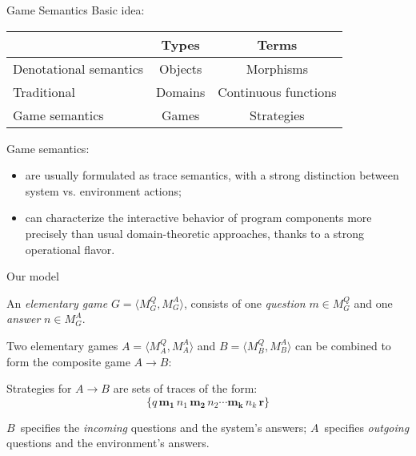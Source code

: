 \documentclass{beamer}
\begin{document}
\begin{frame}{Game Semantics} %
Basic idea:
\begin{center}
  \begin{tabular}{lcc}
  \hline
   & Types & Terms \\
  \hline
  Denotational semantics & Objects & Morphisms \\
  \hspace{1em} Traditional & Domains & Continuous functions \\
  \hspace{1em} Game semantics & Games & Strategies \\
  \hline
  \end{tabular}
\end{center}

\vfill
Game semantics:
\begin{itemize}
\item
  are usually formulated as trace semantics,
  with a strong distinction between
  system vs. environment actions;
\item
  can characterize
  the interactive behavior of program components
  more precisely than
  usual domain-theoretic approaches,
  thanks to a strong operational flavor.
\end{itemize}
\vfill
\end{frame}

\begin{frame}{Our model} %

An
\emph{elementary game}
$G = \langle M_G^Q, M_G^A \rangle$,
consists of
one \emph{question} $m \in M_G^Q$ and
one \emph{answer} $n \in M_G^A$.

\vspace{1ex}
Two elementary games
$A = \langle M_A^Q, M_A^A \rangle$ and
$B = \langle M_B^Q, M_B^A \rangle$
can be combined to form
the composite game $A \rightarrow B$:
\begin{center}
\end{center}

Strategies for $A \rightarrow B$ are sets of traces of the form:
\[
   \{ q \, \mathbf{m_1} \, n_1 \, \mathbf{m_2} \, n_2 \cdots \mathbf{m_k} \, n_k \, \mathbf{r} \}
\]

$B$~specifies the \emph{incoming} questions
and the system's answers;
$A$~specifies \emph{outgoing}
questions and the environment's answers.
\end{frame}
\end{document}
